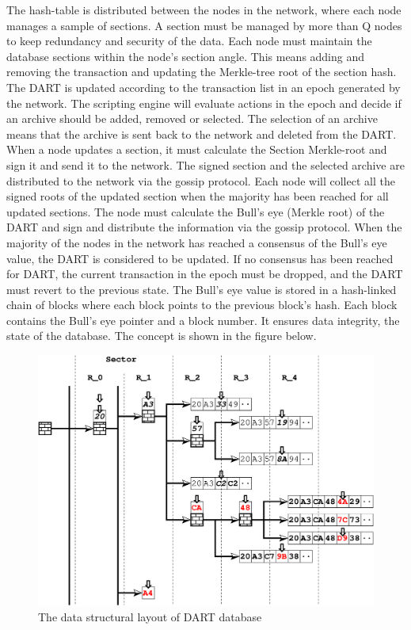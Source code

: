 The hash-table is distributed between the nodes in the network, where each node manages a sample of sections. A section must be managed by more than Q nodes to keep redundancy and security of the data.
Each node must maintain the database sections within the node's section angle. This means adding and removing the transaction and updating the Merkle-tree root of the section hash.
The DART is updated according to the transaction list in an epoch generated by the network. The scripting engine will evaluate actions in the epoch and decide if an archive should be added, removed or selected. The selection of an archive means that the archive is sent back to the network and deleted from the DART. When a node updates a section, it must calculate the Section Merkle-root and sign it and send it to the network.
The signed section and the selected archive are distributed to the network via the gossip protocol. Each node will collect all the signed roots of the updated section when the majority has been reached for all updated sections. The node must calculate the Bull's eye (Merkle root) of the DART and sign and distribute the information via the gossip protocol. When the majority of the nodes in the network has reached a consensus of the Bull's eye value, the DART is considered to be updated.
If no consensus has been reached for DART, the current transaction in the epoch must be dropped, and the DART must revert to the previous state.
The Bull's eye value is stored in a hash-linked chain of blocks where each block points to the previous block's hash. Each block contains the Bull's eye pointer and a block number. It ensures data integrity, the state of the database. The concept is shown in the figure below.

\begin{figure}[H]
 \centering
 \includegraphics[width=1.0\textwidth]{fig/dart_tree_bw.eps}
 \caption{The data structural layout of DART database}
 \label{fig:dartsector}
\end{figure}



